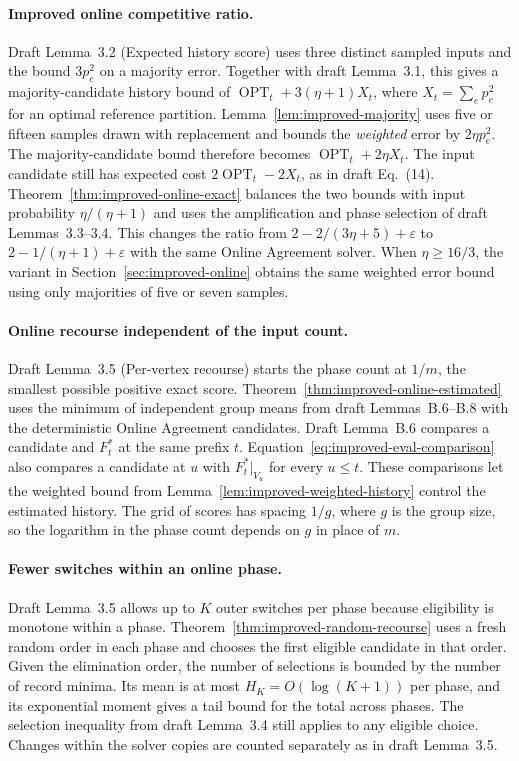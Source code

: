 \documentclass[11pt]{article}
\begin{document}
\paragraph{Improved online competitive ratio.}
Draft Lemma~3.2 (Expected history score) uses three distinct sampled
inputs and the bound $3p_e^2$ on a majority error. Together with draft
Lemma~3.1, this gives a majority-candidate history bound of
$\operatorname{OPT}_t+3(\eta+1)X_t$, where $X_t=\sum_e p_e^2$ for an
optimal reference partition. Lemma~\ref{lem:improved-majority} uses
five or fifteen samples drawn with replacement and bounds the \emph{weighted}
error by $2\eta p_e^2$. The majority-candidate bound therefore becomes
$\operatorname{OPT}_t+2\eta X_t$. The input candidate still has expected
cost $2\operatorname{OPT}_t-2X_t$, as in draft Eq.~(14).
Theorem~\ref{thm:improved-online-exact} balances the two bounds with input
probability $\eta/(\eta+1)$ and uses the amplification and phase selection
of draft Lemmas~3.3--3.4. This changes the ratio from
$2-2/(3\eta+5)+\varepsilon$ to $2-1/(\eta+1)+\varepsilon$ with the same
Online Agreement solver. When $\eta\ge16/3$, the variant in
Section~\ref{sec:improved-online} obtains the same weighted error bound
using only majorities of five or seven samples.

\paragraph{Online recourse independent of the input count.}
Draft Lemma~3.5 (Per-vertex recourse) starts the phase count at $1/m$,
the smallest possible positive exact score.
Theorem~\ref{thm:improved-online-estimated} uses the minimum of independent
group means from draft Lemmas~B.6--B.8 with the deterministic Online
Agreement candidates. Draft Lemma~B.6 compares a candidate and $F_t^*$
at the same prefix $t$. Equation~\eqref{eq:improved-eval-comparison}
also compares a candidate at $u$ with $F_t^*|_{V_u}$ for every $u\le t$.
These comparisons let the weighted bound from
Lemma~\ref{lem:improved-weighted-history} control the estimated history.
The grid of scores has spacing $1/g$, where $g$ is the group size, so
the logarithm in the phase count depends on $g$ in place of $m$.

\paragraph{Fewer switches within an online phase.}
Draft Lemma~3.5 allows up to $K$ outer switches per phase because
eligibility is monotone within a phase.
Theorem~\ref{thm:improved-random-recourse} uses a fresh random order in
each phase and chooses the first eligible candidate in that order.
Given the elimination order, the number of selections is bounded by
the number of record minima. Its mean is at most
$H_K=O(\log(K+1))$ per phase, and its exponential moment gives a tail
bound for the total across phases. The selection inequality from draft
Lemma~3.4 still applies to any eligible choice. Changes within the
solver copies are counted separately as in draft Lemma~3.5.
\end{document}
